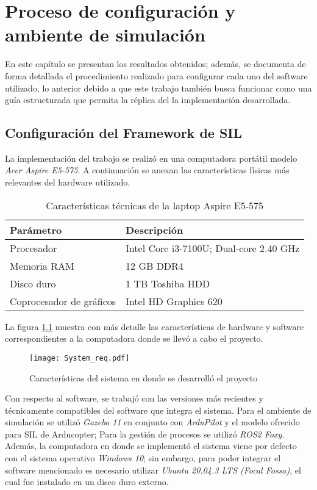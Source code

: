 \chapter{Proceso de configuración y ambiente de simulación}

En este capítulo se presentan los resultados obtenidos; además, se documenta de forma detallada el procedimiento realizado para configurar cada uno del software utilizado, lo anterior debido a que este trabajo también busca funcionar como una guía estructurada que permita la réplica del la implementación desarrollada.

\section{Configuración del Framework de SIL}
La implementación del trabajo se realizó en una computadora portátil modelo \textit{Acer Aspire E5-575}. A continuación se anexan las características físicas más relevantes del hardware utilizado.

\begin{table}
    \centering
    \begin{tabular}{ll}
        \hline
        Parámetro & Descripción\\
        \hline
        \hline
        Procesador & Intel Core i3-7100U; Dual-core 2.40 GHz\\
        Memoria RAM & 12 GB DDR4\\
        Disco duro & 1 TB Toshiba HDD\\
        Coprocesador de gráficos & Intel HD Graphics 620\\
        \hline
        \hline
    \end{tabular}
    \caption{Características técnicas de la laptop Aspire E5-575}
    \label{tab:specs}
\end{table}

La figura \ref{fig:req} muestra con más detalle las características de hardware y software correspondientes a la computadora donde se llevó a cabo el proyecto. 

\begin{figure}[ht]
    \centering
    \texttt{[image: System\_req.pdf]}
    \caption{Características del sistema en donde se desarrolló el proyecto}
    \label{fig:req}
\end{figure}

Con respecto al software, se trabajó con las versiones más recientes y técnicamente compatibles del software que integra el sistema. Para el ambiente de simulación se utilizó \textit{Gazebo 11} en conjunto con \textit{ArduPilot} y el modelo ofrecido para SIL de Arducopter; Para la gestión de procesos se utilizó \textit{ROS2 Foxy}. Además, la computadora en donde se implementó el sistema viene por defecto con el sistema operativo \textit{Windows 10}; sin embargo, para poder integrar el software mencionado es necesario utilizar \textit{Ubuntu 20.04.3 LTS (Focal Fossa)}, el cual fue instalado en un disco duro externo.

